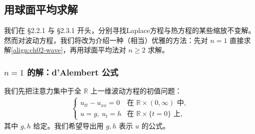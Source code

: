 \documentclass[../../main.tex]{subfiles}
\begin{document}
\subsection{用球面平均求解}\label{subsection:ch02-wave-spherical}

我们在 \S2.2.1 与 \S2.3.1 开头，分别寻找Laplace方程与热方程的某些缩放不变解。然而对波动方程，我们将改为介绍一种（相当）优雅的方法：先对 $n=1$ 直接求解\eqref{align:ch02-wave}，再用球面平均法对 $n\geqslant 2$ 求解。

\subsubsection{$n=1$ 的解：d'Alembert 公式}

我们先把注意力集中于全 $\mathbb{R}$ 上一维波动方程的初值问题：
\begin{align}\label{align:ch02-wave-1d-ivp}
\begin{cases}
u_{tt}-u_{xx}=0 & \text{在 }\mathbb{R}\times(0,\infty)\text{ 中},\\
u=g,\ u_t=h & \text{在 }\mathbb{R}\times\{t=0\}\text{ 上},
\end{cases}
\end{align}
其中 $g,h$ 给定。我们希望导出用 $g,h$ 表示 $u$ 的公式。
\end{document}
